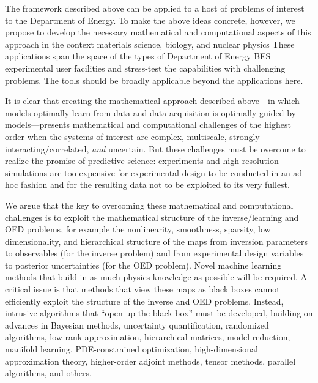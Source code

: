 \documentclass[11pt]{article}
\begin{document}
  The framework described above can be applied to a host of problems
  of interest to the Department of Energy.  To make the above ideas
  concrete, however, we propose to develop the necessary mathematical
  and computational aspects of this approach in the context materials science, biology, and nuclear physics
These applications span the space of the types of Department of Energy BES
  experimental user facilities and stress-test the capabilities with
  challenging problems.  The tools should be broadly applicable beyond
  the applications here.

It is clear that creating the mathematical approach described
above---in which models optimally learn from data and data acquisition
is optimally guided by models---presents mathematical and
computational challenges of the highest order when the systems of
interest are complex, multiscale, strongly interacting/correlated, {\em and}
uncertain. But these challenges must be overcome to realize the
promise of predictive science: experiments and high-resolution
simulations are too expensive for experimental design to be conducted
in an ad hoc fashion and for the resulting data not to be exploited to
its very fullest.

We argue that the key to overcoming these mathematical and
computational challenges is to exploit the mathematical structure of
the inverse/learning and OED problems, for example the nonlinearity,
smoothness, sparsity, low dimensionality, and hierarchical structure
of the maps from inversion parameters to observables (for the inverse
problem) and from experimental design variables to posterior
uncertainties (for the OED problem).  Novel machine learning methods
that build in as much physics knowledge as possible will be required.
A critical issue is that methods that view these maps as black boxes
cannot efficiently exploit the structure of the inverse and OED
problems. Instead, intrusive algorithms that ``open up the black box''
must be developed, building on advances in Bayesian methods,
uncertainty quantification, randomized algorithms, low-rank
approximation, hierarchical matrices, model reduction, manifold
learning, PDE-constrained optimization, high-dimensional approximation
theory, higher-order adjoint methods, tensor methods, parallel
algorithms, and others.
\end{document}
